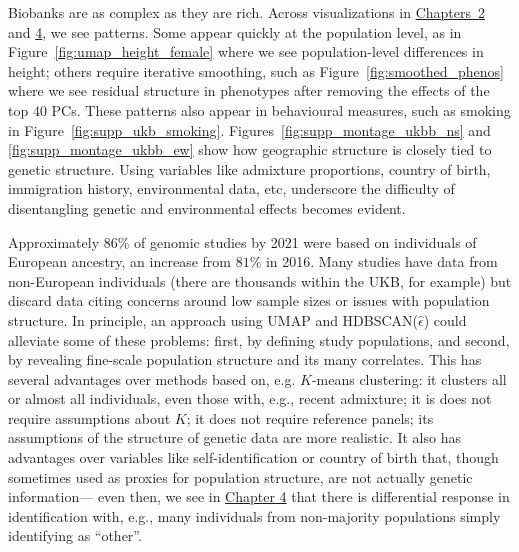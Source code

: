 Biobanks are as complex as they are rich. Across visualizations in \hyperref[chap:chapter2]{Chapters~2} and \hyperref[chap:chapter4]{4}, we see patterns. Some appear quickly at the population level, as in Figure~\ref{fig:umap_height_female} where we see population-level differences in height; others require iterative smoothing, such as  Figure~\ref{fig:smoothed_phenos} where we see residual structure in phenotypes after removing the effects of the top $40$ PCs. These patterns also appear in behavioural measures, such as smoking in Figure~\ref{fig:supp_ukb_smoking}. Figures~\ref{fig:supp_montage_ukbb_ns} and \ref{fig:supp_montage_ukbb_ew} show how geographic structure is closely tied to genetic structure. Using variables like admixture proportions, country of birth, immigration history, environmental data, etc, underscore the difficulty of disentangling genetic and environmental effects becomes evident. %

Approximately $86\%$ of genomic studies by 2021 were based on individuals of European ancestry, an increase from $81\%$ in 2016\citep{fatumo_roadmap_2022,kaplan_polygenic_2022}. Many studies have data from non-European individuals (there are thousands within the UKB, for example) but discard data citing concerns around low sample sizes or issues with population structure\citep{ben-eghan_dont_2020}. In principle, an approach using UMAP and HDBSCAN($\hat{\epsilon}$) could alleviate some of these problems: first, by defining study populations, and second, by revealing fine-scale population structure and its many correlates. This has several advantages over methods based on, e.g. $K$-means clustering: it clusters all or almost all individuals, even those with, e.g., recent admixture; it is does not require assumptions about $K$; it does not require reference panels; its assumptions of the structure of genetic data are more realistic. It also has advantages over variables like self-identification or country of birth that, though sometimes used as proxies for population structure, are not actually genetic information--- even then, we see in \hyperref[chap:chapter4]{Chapter 4} that there is differential response in identification with, e.g., many individuals from non-majority populations simply identifying as ``other''.

